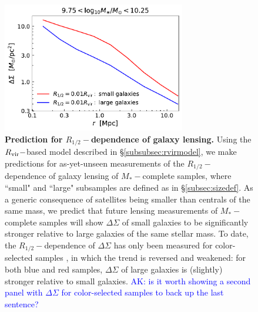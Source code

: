 \documentclass[usenatbib,usegraphicx,letterpaper]{mn2e}
\newcommand{\rhalf}{R_{1/2}}
\newcommand{\mstar}{M_{\ast}}
\newcommand{\rvir}{R_{\rm vir}}
\begin{document}

\begin{figure}
\centering
\includegraphics[width=8cm]{FIGS/rvir_only_lensing_prediction.pdf}
\caption{
{\bf Prediction for $\rhalf-$dependence of galaxy lensing.}
Using the $\rvir-$based model described in \S\ref{subsubsec:rvirmodel}, we make predictions for as-yet-unseen measurements of the $\rhalf-$dependence of galaxy lensing of $\mstar-$complete samples, where ``small" and ``large" subsamples are defined as in \S\ref{subsec:sizedef}. As a generic consequence of satellites being smaller than centrals of the same mass, we predict that future lensing measurements of $\mstar-$complete samples will show $\Delta\Sigma$ of small galaxies to be significantly stronger relative to large galaxies of the same stellar mass. To date, the $\rhalf-$dependence of $\Delta\Sigma$ has only been measured for color-selected samples \citep{charlton_etal17}, in which the trend is reversed and weakened: for both blue and red samples, $\Delta\Sigma$ of large galaxies is (slightly) stronger relative to small galaxies. \textcolor{blue}{AK: is it worth showing a second panel with $\Delta\Sigma$ for color-selected samples to back up the last sentence?}
}
\label{fig:lensingprediction}
\end{figure}
\end{document}
